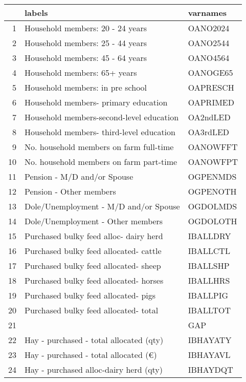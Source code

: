 \documentclass{article}\usepackage{graphicx, color}
\begin{document}
\begin{flushleft}
\newpage
\begin{table}[ht]
\begin{center}
\begin{tabular}{rll}
  \hline
 & labels & varnames \\ 
  \hline
1 & Household members: 20 - 24 years & OANO2024 \\ 
  2 & Household members: 25 - 44 years & OANO2544 \\ 
  3 & Household members: 45 - 64 years & OANO4564 \\ 
  4 & Household members: 65+ years & OANOGE65 \\ 
  5 & Household members: in pre school & OAPRESCH \\ 
  6 & Household members- primary education & OAPRIMED \\ 
  7 & Household members-second-level education & OA2ndLED \\ 
  8 & Household members- third-level education & OA3rdLED \\ 
  9 & No. household members on farm full-time & OANOWFFT \\ 
  10 & No. household members on farm part-time & OANOWFPT \\ 
  11 & Pension - M/D and/or Spouse & OGPENMDS \\ 
  12 & Pension - Other members & OGPENOTH \\ 
  13 & Dole/Unemployment - M/D and/or Spouse & OGDOLMDS \\ 
  14 & Dole/Unemployment - Other members & OGDOLOTH \\ 
  15 & Purchased bulky feed alloc- dairy herd & IBALLDRY \\ 
  16 & Purchased bulky feed allocated- cattle & IBALLCTL \\ 
  17 & Purchased bulky feed allocated- sheep & IBALLSHP \\ 
  18 & Purchased bulky feed allocated- horses & IBALLHRS \\ 
  19 & Purchased bulky feed allocated- pigs & IBALLPIG \\ 
  20 & Purchased bulky feed allocated- total & IBALLTOT \\ 
  21 &  & GAP \\ 
  22 & Hay - purchased - total allocated  (qty) & IBHAYATY \\ 
  23 & Hay - purchased - total allocated  (€) & IBHAYAVL \\ 
  24 & Hay - purchased alloc-dairy herd (qty) & IBHAYDQT \\ 

\end{tabular}
\end{center}
\end{table}
\end{flushleft}
\end{document}
